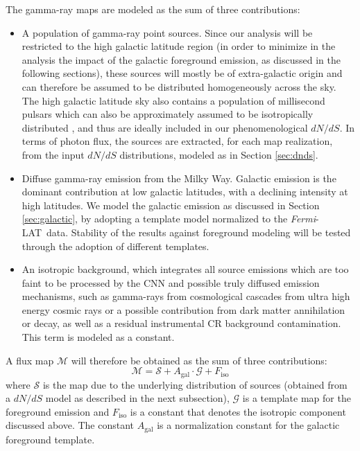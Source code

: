\documentclass[a4paper,11pt]{article}
\newcommand{\fermi}{\textsl{Fermi}-LAT\ }
\newcommand{\fiso}{{F_\textrm{iso}}}
\newcommand{\dnds}{dN/dS }
\begin{document}
The gamma-ray maps are modeled as the sum of three contributions:
\begin{itemize}
\item A population of gamma-ray point sources. Since our analysis will be restricted to the high galactic latitude region (in order to minimize in the analysis the impact of the galactic foreground emission, as discussed in the following sections), these sources will mostly be of extra-galactic origin and can therefore be assumed to be distributed homogeneously across the sky. 
The high galactic latitude sky also contains a population of millisecond pulsars which can also be approximately assumed to be isotropically distributed \cite{Fermi-LAT:2013svs}, and thus are ideally included in our phenomenological $\dnds$.
In terms of photon flux, the sources are extracted, for each map realization, from the input $\dnds$ distributions, modeled as in Section \ref{sec:dnds}.

\item Diffuse gamma-ray emission from the Milky Way. Galactic emission is the dominant contribution at low galactic latitudes, with a declining intensity at high latitudes. We model the galactic emission as discussed in Section \ref{sec:galactic}, by adopting a template model normalized to the \fermi data. 
Stability of the results against foreground modeling will be tested through the adoption of different templates.

\item An isotropic background, which integrates all source emissions which are too faint to be processed by the CNN and possible truly diffused emission mechanisms, such as gamma-rays from cosmological cascades from ultra high energy cosmic rays or a possible contribution from dark matter annihilation or decay, as well as a residual instrumental CR background contamination. This term is modeled as a constant.

\end{itemize}
\noindent
%
A flux map $\mathcal{M}$ will therefore be obtained as the sum of three contributions:
\begin{equation}
    \mathcal{M} = \mathcal{S} + A_\textrm{gal} \cdot \mathcal{G} + \fiso
    \label{eq:map}
\end{equation}
where $\mathcal{S}$ is the map due to the underlying distribution of sources (obtained from a $\dnds$ model as described in the next subsection), $\mathcal{G}$ is a template map for the foreground emission and $\fiso$ is a constant that denotes the isotropic component discussed above. The constant $A_\textrm{gal}$ is a normalization constant for the galactic foreground template. 
\end{document}
